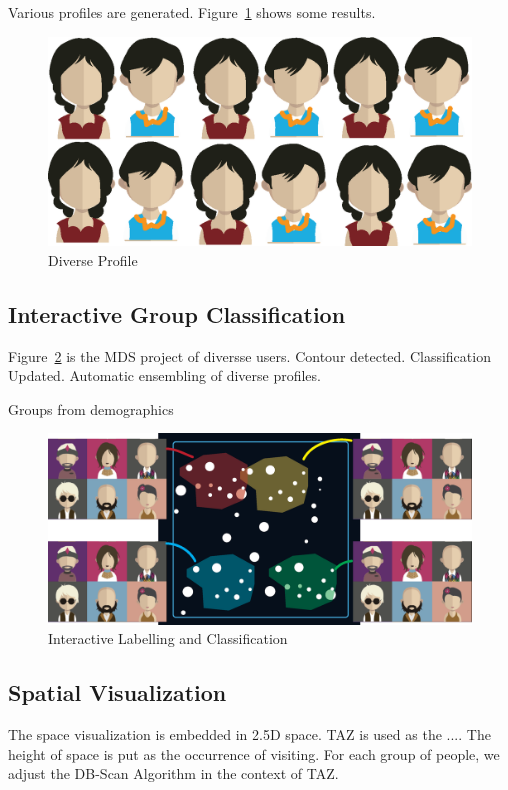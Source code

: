Various profiles are generated. Figure~\ref{fig:div_profile} shows some results.

\begin{figure}[htb!]
 \centering %
 \includegraphics[width=\columnwidth]{pictures/design_div}
 \caption{Diverse Profile}
 \label{fig:div_profile}
\end{figure}

\subsection{Interactive Group Classification}

Figure~\ref{fig:mds} is the MDS project of diversse users. Contour detected. Classification Updated. Automatic ensembling of diverse profiles. 

Groups from demographics

\begin{figure}[htb!]
 \centering %
 \includegraphics[width=\columnwidth]{pictures/mds}
 \caption{Interactive Labelling and Classification}
 \label{fig:mds}
\end{figure}

\subsection{Spatial Visualization}

The space visualization is embedded in 2.5D space. TAZ is used as the .... The height of space is put as the occurrence of visiting. For each group of people, we adjust the DB-Scan Algorithm in the context of TAZ. 